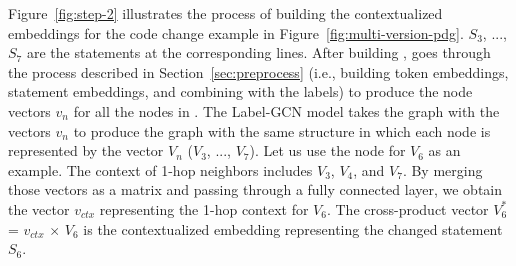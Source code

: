
Figure~\ref{fig:step-2} illustrates the process of building the
contextualized embeddings for the code change example in
Figure~\ref{fig:multi-version-pdg}. $S_3$, ..., $S_7$ are the
statements at the corresponding lines. After building {\mvpdg},
{\tool} goes through the process described in
Section~\ref{sec:preprocess} (i.e., building token embeddings,
statement embeddings, and combining with the labels) to produce the
node vectors $v_n$ for all the nodes in {\mvpdg}. The Label-GCN model
takes the graph with the vectors $v_n$ to produce the graph with the
same structure in which each node is represented by the vector $V_n$
($V_3$, ..., $V_7$). Let us use the node for $V_6$ as an example.  The
context of 1-hop neighbors includes $V_3$, $V_4$, and $V_7$. By
merging those vectors as a matrix and passing through a fully
connected layer, we obtain the vector $v_{ctx}$ representing the 1-hop
context for $V_6$. The cross-product vector  $V^{*}_6$ = $v_{ctx}$ $\times$ $V_6$
is the contextualized embedding representing the changed statement
$S_6$.





